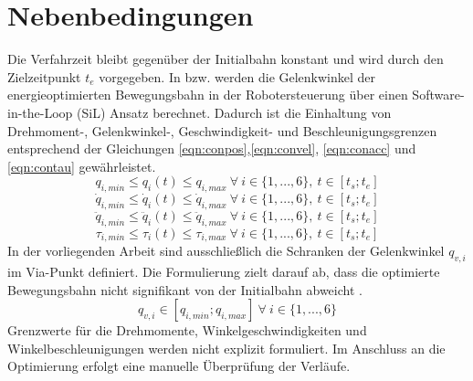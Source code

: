 \section{Nebenbedingungen}
\label{sec:Nebenbedingungen}
Die Verfahrzeit bleibt gegenüber der Initialbahn konstant und wird durch den Zielzeitpunkt $t_e$ vorgegeben. 
In \cite[S.~40]{Eggers.2019} bzw. \cite[S.~5]{Hansen.2012} werden die Gelenkwinkel der energieoptimierten Bewegungsbahn in der Robotersteuerung über einen Software-in-the-Loop (SiL) Ansatz berechnet. Dadurch ist die Einhaltung von Drehmoment-, Gelenkwinkel-, Geschwindigkeit- und Beschleunigungsgrenzen entsprechend der Gleichungen \ref{eqn:conpos},\ref{eqn:convel}, \ref{eqn:conacc} und \ref{eqn:contau} gewährleistet. 
%
\begin{equation}
	\label{eqn:conpos}
	q_{i,min} \leq q_{i}(t) \leq q_{i,max}  ~\forall~ i \in \{1,...,6\},~ t \in [t_s;t_e]
\end{equation}
%
\begin{equation}
	\label{eqn:convel}
	\dot{q}_{i,min} \leq \dot{q}_{i}(t) \leq \dot{q}_{i,max}  ~\forall~ i \in \{1,...,6\},~ t \in [t_s;t_e]
\end{equation}
%
\begin{equation}
	\label{eqn:conacc}
	\ddot{q}_{i,min} \leq \ddot{q}_{i}(t) \leq \ddot{q}_{i,max}  ~\forall~ i \in \{1,...,6\}, ~t \in [t_s;t_e]
\end{equation}
%
\begin{equation}
	\label{eqn:contau}
	\tau_{i,min} \leq \tau_{i}(t) \leq \tau_{i,max}  ~\forall~ i \in \{1,...,6\},~ t \in [t_s;t_e]
\end{equation}
%
In der vorliegenden Arbeit sind ausschließlich die Schranken der Gelenkwinkel $q_{v,i}$ im Via-Punkt definiert. Die Formulierung zielt darauf ab, dass die optimierte Bewegungsbahn nicht signifikant von der Initialbahn abweicht \cite[S.~5]{Hansen.2012}.
\begin{equation}
	\label{eqn:Schranken}
	q_{v,i} \in [q_{i,min};q_{i,max}] ~\forall~ i \in \{1,...,6\}
\end{equation}
Grenzwerte für die Drehmomente, Winkelgeschwindigkeiten und Winkelbeschleunigungen werden nicht explizit formuliert.  Im Anschluss an die Optimierung erfolgt eine manuelle Überprüfung der Verläufe.
%
